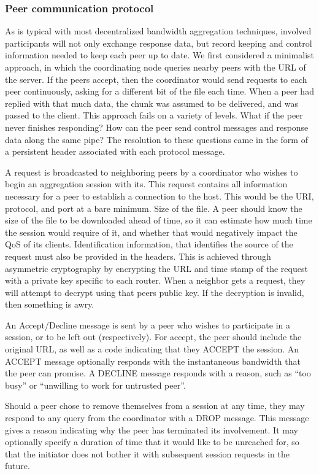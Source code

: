 \documentclass[12pt]{article}
\begin{document}
		\subsubsection{Peer communication protocol}

			As is typical with most decentralized bandwidth aggregation techniques, involved participants will not only exchange response data, but record keeping and control information needed to keep each peer up to date. We first considered a minimalist approach, in which the coordinating node queries nearby peers with the URL of the server. If the peers accept, then the coordinator would send requests to each peer continuously, asking for a different bit of the file each time. When a peer had replied with that much data, the chunk was assumed to be delivered, and was passed to the client. This approach fails on a variety of levels. What if the peer never finishes responding? How can the peer send control messages and response data along the same pipe? The resolution to these questions came in the form of a persistent header associated with each protocol message.

			A request is broadcasted to neighboring peers by a coordinator who wishes to begin an aggregation session with its. This request contains all information necessary for a peer to establish a connection to the host. This would be the URI, protocol, and port at a bare minimum.
			Size of the file. A peer should know the size of the file to be downloaded ahead of time, so it can estimate how much time the session would require of it, and whether that would negatively impact the QoS of its clients. Identification information, that identifies the source of the request must also be provided in the headers. This is achieved through asymmetric cryptography by encrypting the URL and time stamp of the request with a private key specific to each router. When a neighbor gets a request, they will attempt to decrypt using that peers public key. If the decryption is invalid, then something is awry.

			An Accept/Decline message is sent by a peer who wishes to participate in a session, or to be left out (respectively). For accept, the peer should include the original URL, as well as a code indicating that they ACCEPT the session. An ACCEPT message optionally responds with the instantaneous bandwidth that the peer can promise. A DECLINE message responds with a reason, such as ``too busy'' or ``unwilling to work for untrusted peer''.

			Should a peer chose to remove themselves from a session at any time, they may respond to any query from the coordinator with a DROP message. This message gives a reason indicating why the peer has terminated its involvement. It may optionally specify a duration of time that it would like to be unreached for, so that the initiator does not bother it with subsequent session requests in the future.
			
\end{document}
